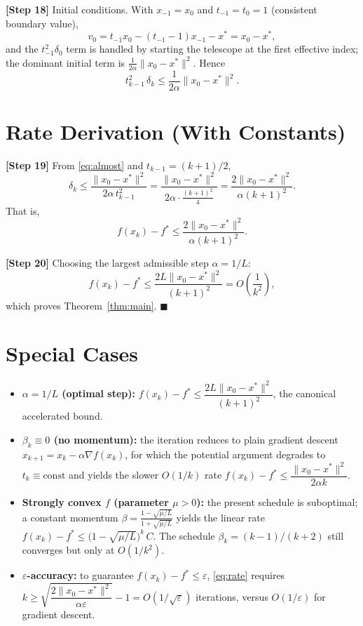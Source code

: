 \documentclass{article}
\begin{document}
\textbf{[Step 18]} Initial conditions. With $x_{-1}=x_0$ and $t_{-1}=t_0=1$
(consistent boundary value), 
\[
v_0 = t_{-1}x_0 - (t_{-1}-1)x_{-1} - x^* = x_0 - x^*,
\]
and the $t_{-1}^2\delta_0$ term is handled by starting the telescope at the
first effective index; the dominant initial term is
$\frac{1}{2\alpha}\|x_0 - x^*\|^2$. Hence
\begin{equation}
t_{k-1}^2\,\delta_k \le \frac{1}{2\alpha}\|x_0 - x^*\|^2. \label{eq:almost}
\end{equation}

\section*{Rate Derivation (With Constants)}

\textbf{[Step 19]} From \eqref{eq:almost} and $t_{k-1} = (k+1)/2$,
\[
\delta_k \le \frac{\|x_0 - x^*\|^2}{2\alpha\, t_{k-1}^2}
= \frac{\|x_0 - x^*\|^2}{2\alpha \cdot \frac{(k+1)^2}{4}}
= \frac{2\|x_0 - x^*\|^2}{\alpha (k+1)^2}.
\]
That is,
\begin{equation}
f(x_k) - f^* \le \frac{2\|x_0 - x^*\|^2}{\alpha (k+1)^2}. \label{eq:rate}
\end{equation}

\textbf{[Step 20]} Choosing the largest admissible step $\alpha = 1/L$:
\[
f(x_k) - f^* \le \frac{2L\|x_0 - x^*\|^2}{(k+1)^2} = O\!\left(\frac{1}{k^2}\right),
\]
which proves Theorem~\ref{thm:main}. \hfill$\blacksquare$

\section*{Special Cases}

\begin{itemize}
\item \textbf{$\alpha = 1/L$ (optimal step):}
      $f(x_k) - f^* \le \dfrac{2L\|x_0-x^*\|^2}{(k+1)^2}$, the canonical
      accelerated bound.

\item \textbf{$\beta_k \equiv 0$ (no momentum):} the iteration reduces to plain
      gradient descent $x_{k+1} = x_k - \alpha\nabla f(x_k)$, for which the
      potential argument degrades to $t_k \equiv \text{const}$ and yields the
      slower $O(1/k)$ rate
      $f(x_k) - f^* \le \dfrac{\|x_0-x^*\|^2}{2\alpha k}$.

\item \textbf{Strongly convex $f$ (parameter $\mu>0$):} the present
      schedule is suboptimal; a constant momentum
      $\beta = \frac{1-\sqrt{\mu/L}}{1+\sqrt{\mu/L}}$ yields the linear rate
      $f(x_k) - f^* \le \big(1-\sqrt{\mu/L}\big)^{k}\,C$. The schedule
      $\beta_k=(k-1)/(k+2)$ still converges but only at $O(1/k^2)$.

\item \textbf{$\varepsilon$-accuracy:} to guarantee $f(x_k)-f^* \le \varepsilon$,
      \eqref{eq:rate} requires
      $k \ge \sqrt{\dfrac{2\|x_0-x^*\|^2}{\alpha\varepsilon}} - 1
      = O(1/\sqrt{\varepsilon})$ iterations, versus $O(1/\varepsilon)$ for
      gradient descent.
\end{itemize}
\end{document}
